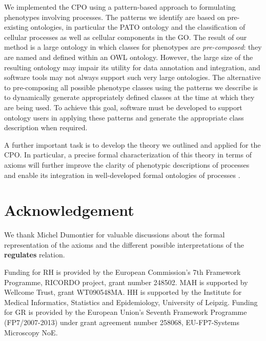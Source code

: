 \documentclass{bioinfo}
\renewcommand{\cite}{\citep}
\begin{document}
We implemented the CPO using a pattern-based approach to formulating
phenotypes involving processes. The patterns we identify are based on
pre-existing ontologies, in particular the PATO ontology and the
classification of cellular processes as well as cellular components in
the GO. The result of our method is a large ontology in which classes
for phenotypes are {\em pre-composed}: they are named and defined
within an OWL ontology. However, the large size of the resulting
ontology may impair its utility for data annotation and integration,
and software tools may not always support such very large
ontologies. The alternative to pre-composing all possible phenotype
classes using the patterns we describe is to dynamically generate
appropriately defined classes at the time at which they are being
used. To achieve this goal, software must be developed to support
ontology users in applying these patterns and generate the appropriate
class description when required.

A further important task is to develop the theory we outlined and
applied for the CPO. In particular, a precise formal characterization
of this theory in terms of axioms will further improve the clarity of
phenotypic descriptions of processes and enable its integration in
well-developed formal ontologies of processes \cite{Herre2006,
  Gruninger2010}.

\section{Acknowledgement}
We thank Michel Dumontier for valuable discussions about the formal
representation of the axioms and the different possible
interpretations of the {\bf regulates} relation.

Funding for RH is provided by the European Commission's 7th Framework
Programme, RICORDO project, grant number 248502. MAH is supported by
Wellcome Trust, grant WT090548MA. HH is supported by the Institute for
Medical Informatics, Statistics and Epidemiology, University of
Leipzig.  Funding for GR is provided by the European Union's Seventh
Framework Programme (FP7/2007-2013) under grant agreement number
258068, EU-FP7-Systems Microscopy NoE. 

% 
\end{document}
